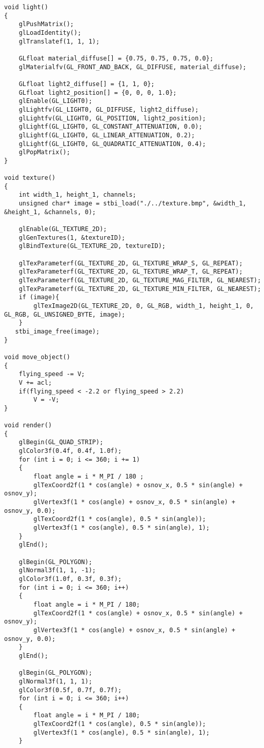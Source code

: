 \documentclass[a4paper, 14pt]{extarticle}
\begin{document}
\begin{verbatim}
void light()
{
    glPushMatrix();
    glLoadIdentity();
    glTranslatef(1, 1, 1);

    GLfloat material_diffuse[] = {0.75, 0.75, 0.75, 0.0};
    glMaterialfv(GL_FRONT_AND_BACK, GL_DIFFUSE, material_diffuse);

    GLfloat light2_diffuse[] = {1, 1, 0};
    GLfloat light2_position[] = {0, 0, 0, 1.0};
    glEnable(GL_LIGHT0);
    glLightfv(GL_LIGHT0, GL_DIFFUSE, light2_diffuse);
    glLightfv(GL_LIGHT0, GL_POSITION, light2_position);
    glLightf(GL_LIGHT0, GL_CONSTANT_ATTENUATION, 0.0);
    glLightf(GL_LIGHT0, GL_LINEAR_ATTENUATION, 0.2);
    glLightf(GL_LIGHT0, GL_QUADRATIC_ATTENUATION, 0.4);
    glPopMatrix();
}

void texture()
{
    int width_1, height_1, channels;
    unsigned char* image = stbi_load("./../texture.bmp", &width_1, &height_1, &channels, 0);
    
    glEnable(GL_TEXTURE_2D);
    glGenTextures(1, &textureID);
    glBindTexture(GL_TEXTURE_2D, textureID);

    glTexParameterf(GL_TEXTURE_2D, GL_TEXTURE_WRAP_S, GL_REPEAT);
    glTexParameterf(GL_TEXTURE_2D, GL_TEXTURE_WRAP_T, GL_REPEAT);
    glTexParameterf(GL_TEXTURE_2D, GL_TEXTURE_MAG_FILTER, GL_NEAREST);
    glTexParameterf(GL_TEXTURE_2D, GL_TEXTURE_MIN_FILTER, GL_NEAREST);
    if (image){
        glTexImage2D(GL_TEXTURE_2D, 0, GL_RGB, width_1, height_1, 0, GL_RGB, GL_UNSIGNED_BYTE, image);
    }
   stbi_image_free(image);
}

void move_object()
{
    flying_speed -= V;
    V += acl;
    if(flying_speed < -2.2 or flying_speed > 2.2)
        V = -V;
}

void render()
{
    glBegin(GL_QUAD_STRIP);
    glColor3f(0.4f, 0.4f, 1.0f);
    for (int i = 0; i <= 360; i += 1)
    {
        float angle = i * M_PI / 180 ;
        glTexCoord2f(1 * cos(angle) + osnov_x, 0.5 * sin(angle) + osnov_y);
        glVertex3f(1 * cos(angle) + osnov_x, 0.5 * sin(angle) + osnov_y, 0.0);
        glTexCoord2f(1 * cos(angle), 0.5 * sin(angle));
        glVertex3f(1 * cos(angle), 0.5 * sin(angle), 1);
    }
    glEnd();

    glBegin(GL_POLYGON);
    glNormal3f(1, 1, -1);
    glColor3f(1.0f, 0.3f, 0.3f);
    for (int i = 0; i <= 360; i++)
    {
        float angle = i * M_PI / 180;
        glTexCoord2f(1 * cos(angle) + osnov_x, 0.5 * sin(angle) + osnov_y);
        glVertex3f(1 * cos(angle) + osnov_x, 0.5 * sin(angle) + osnov_y, 0.0);
    }
    glEnd();

    glBegin(GL_POLYGON);
    glNormal3f(1, 1, 1);
    glColor3f(0.5f, 0.7f, 0.7f);
    for (int i = 0; i <= 360; i++)
    {
        float angle = i * M_PI / 180;
        glTexCoord2f(1 * cos(angle), 0.5 * sin(angle));
        glVertex3f(1 * cos(angle), 0.5 * sin(angle), 1);
    }
    

\end{verbatim}
\end{document}
